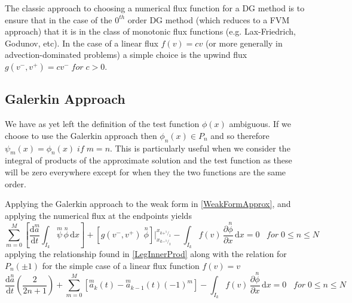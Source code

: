 \documentclass[letterpaper]{article}
\begin{document}
The classic approach to choosing a numerical flux function for a DG method is to ensure that in the case of the $0^{th}$ order DG method (which reduces to a FVM approach) that it is in the class of monotonic flux functions (e.g. Lax-Friedrich, Godunov, etc). In the case of a linear flux $f(v) = cv$ (or more generally in advection-dominated problems) a simple choice is the upwind flux $g(v^-,v^+) = cv^- \;for\; c>0$.

\subsection{Galerkin Approach}
We have as yet left the definition of the test function $\phi(x)$ ambiguous. If we choose to use the Galerkin approach then $\phi_n(x) \in P_n$ and so therefore $\psi_m(x) = \phi_n(x) \;if\; m=n$. This is particularly useful when we consider the integral of products of the approximate solution and the test function as these will be zero everywhere except for when they the two functions are the same order.

Applying the Galerkin approach to the weak form in \eqref{WeakFormApprox}, and applying the numerical flux at the endpoints yields
	\begin{equation}\label{WeakForm}
	\sum_{m=0}^M \left[ \frac{\mathrm{d}\overset{m}{a}}{\mathrm{d} t} \int_{I_k}\! \overset{m}{\psi} \, \overset{n}{\phi} \,\mathrm{d}x \right] + 
	[g(v^-,v^+) \; \overset{n}{\phi}] \Big\rvert_{x_{k-^1\!/_2}}^{x_{k+^1\!/_2}} -  
	\int_{I_k}\! f(v) \,\frac{\partial \overset{n}{\phi}}{\partial x} \,\mathrm{d}x = 0
	\;\;\; for \; 0 \leq n \leq N
	\end{equation}
applying the relationship found in \eqref{LegInnerProd} along with the relation for $P_n(\pm 1)$ for the simple case of a linear flux function $f(v) = v$
	\begin{equation}\label{WeakFormLinear}
	\frac{\mathrm{d}\overset{n}{a}}{\mathrm{d} t}\left(\frac{2}{2n+1}\right) + 
	\sum_{m=0}^M \left[ \overset{m}{a}_k(t) - \overset{m}{a}_{k-1}(t)(-1)^m \right] -
	\int_{I_k}\! f(v) \,\frac{\partial \overset{n}{\phi}}{\partial x} \,\mathrm{d}x = 0 \;\;\; for \; 0 \leq n \leq N
	\end{equation}
\end{document}
